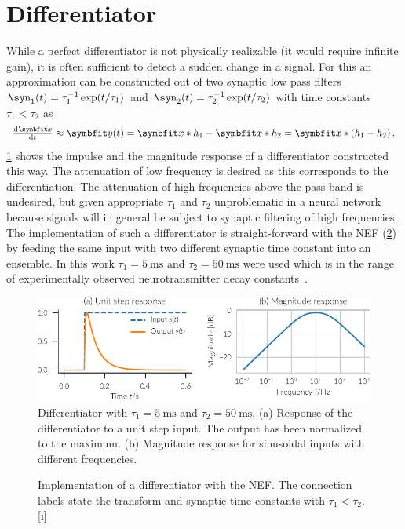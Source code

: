 \section{Differentiator}
While a perfect differentiator is not physically realizable (it would require infinite gain), it is often sufficient to detect a sudden change in a signal.
For this an approximation can be constructed out of two synaptic low pass filters $\syn_1(t) =  \tau_1^{-1} \exp(t/\tau_1)$ and $\syn_2(t) = \tau_2^{-1} \exp(t/\tau_2)$ with time constants $\tau_1 < \tau_2$ as
\begin{equation}
    \od{\vc x}{t} \approx \vc y(t) = \vc x * h_1 - \vc x * h_2 = \vc x * \del{h_1 - h_2} \text{.}
\end{equation}
\cref{fig:differentiator} shows the impulse and the magnitude response of a differentiator constructed this way.
The attenuation of low frequency is desired as this corresponds to the differentiation.
The attenuation of high-frequencies above the pass-band is undesired, but given appropriate $\tau_1$ and $\tau_2$ unproblematic in a neural network because signals will in general be subject to synaptic filtering of high frequencies.
The implementation of such a differentiator is straight-forward with the NEF (\cref{fig:differentiator-net}) by feeding the same input with two different synaptic time constant into an ensemble.
In this work $\tau_1 = \SI{5}{\milli\second}$ and $\tau_2 = \SI{50}{\milli\second}$ were used which is in the range of experimentally observed neurotransmitter decay constants~\parencite{sah1990-1,moreno-bote2005}.
\begin{figure}
    \centering
    \includegraphics{figures/differentiator}
    \caption[Differentiator]{Differentiator with $\tau_1 = \SI{5}{\milli\second}$ and $\tau_2 = \SI{50}{\milli\second}$. (a) Response of the differentiator to a unit step input. The output has been normalized to the maximum. (b) Magnitude response for sinusoidal inputs with different frequencies.}\label{fig:differentiator}
\end{figure}
\begin{figure}
    \begin{captionbeside}{Implementation of a differentiator with the NEF\@. The connection labels state the transform and synaptic time constants with $\tau_1 < \tau_2$.}[i]
    \end{captionbeside}\label{fig:differentiator-net}
\end{figure}


